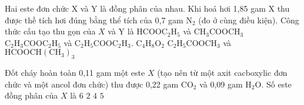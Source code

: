 
\begin{vdex}[2][(Đề TSĐH B - 2007)]
	Hai este đơn chức $\mathrm{X}$ và $\mathrm{Y}$ là đồng phân của nhau. Khi hoá hơi 1,85 gam $\mathrm{X}$ thu được thề tích hơi đúng bằng thể tích của 0,7 gam $\mathrm{N}_2$ (đo ở cùng điều kiện). Công thức cấu tạo thu gọn của $X$ và $\mathrm{Y}$ là
	\choice
	{%
		\True $\mathrm{HCOOC}_2 \mathrm{H}_5$ và $\mathrm{CH}_3 \mathrm{COOCH}_3$
	}
	{%
		$\mathrm{C}_2 \mathrm{H}_3 \mathrm{COOC}_2 \mathrm{H}_5$ và $\mathrm{C}_2 \mathrm{H}_5 \mathrm{COOC}_2 \mathrm{H}_3$.
	}
	{%
		$\mathrm{C}_4 \mathrm{H}_8 \mathrm{O}_2$
	}
	{%
		$\mathrm{C}_2 \mathrm{H}_5 \mathrm{COOCH}_3$ và $\mathrm{HCOOCH}\left(\mathrm{CH}_3\right)_3$
	}
	\huongdan{
		
	}
\end{vdex}


\begin{vdex}[2][(Đề TSĐH A - 2011)]
Đốt cháy hoàn toàn 0,11 gam một este $X$ (tạo nên từ một axit cacboxylic đơn chức và một ancol đơn chức) thu được 0,22 gam $\mathrm{CO}_2$ và 0,09 gam $\mathrm{H}_2 \mathrm{O}$. Số este đồng phân của $X$ là
	\choice
	{%
		 $ 6 $
	}
	{%
		$ 2 $
	}
	{%
	\True	$ 4 $
	}
	{%
		$ 5 $
	}
	\huongdan{
		
	}
\end{vdex}

